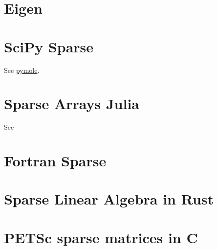 \section{Eigen}

\section{SciPy Sparse}

See \href{https://github.com/nutrik/pymole}{pymole}.

\section{Sparse Arrays Julia}

See \href{https://robertsweeneyblanco.github.io/Programming_for_Mathematical_Applications/content/Sparse_Matrices/Sparse_Matrices_In_Julia.html}{}

\section{Fortran Sparse}

\section{Sparse Linear Algebra in Rust}


\section{PETSc sparse matrices in C}

